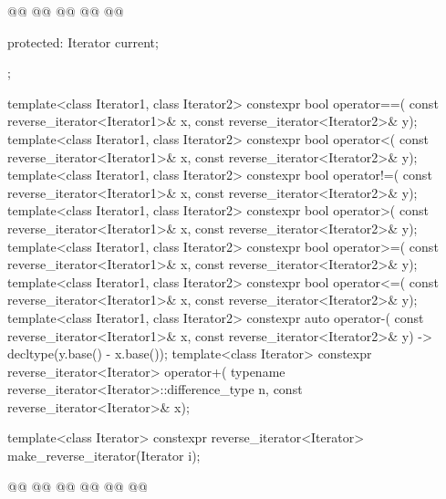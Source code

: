 \begin{codeblock}
{{    @@
      @@
    @@
      @@
        @@

  protected:
    Iterator current;
  };

  template<class Iterator1, class Iterator2>
    constexpr bool operator==(
      const reverse_iterator<Iterator1>& x,
      const reverse_iterator<Iterator2>& y);
  template<class Iterator1, class Iterator2>
    constexpr bool operator<(
      const reverse_iterator<Iterator1>& x,
      const reverse_iterator<Iterator2>& y);
  template<class Iterator1, class Iterator2>
    constexpr bool operator!=(
      const reverse_iterator<Iterator1>& x,
      const reverse_iterator<Iterator2>& y);
  template<class Iterator1, class Iterator2>
    constexpr bool operator>(
      const reverse_iterator<Iterator1>& x,
      const reverse_iterator<Iterator2>& y);
  template<class Iterator1, class Iterator2>
    constexpr bool operator>=(
      const reverse_iterator<Iterator1>& x,
      const reverse_iterator<Iterator2>& y);
  template<class Iterator1, class Iterator2>
    constexpr bool operator<=(
      const reverse_iterator<Iterator1>& x,
      const reverse_iterator<Iterator2>& y);
  template<class Iterator1, class Iterator2>
    constexpr auto operator-(
      const reverse_iterator<Iterator1>& x,
      const reverse_iterator<Iterator2>& y) -> decltype(y.base() - x.base());
  template<class Iterator>
    constexpr reverse_iterator<Iterator> operator+(
      typename reverse_iterator<Iterator>::difference_type n,
      const reverse_iterator<Iterator>& x);

  template<class Iterator>
    constexpr reverse_iterator<Iterator> make_reverse_iterator(Iterator i);

  @@
    @@
      @@
    @@
                                          @@
  @\added{\}}@
}
\end{codeblock}

